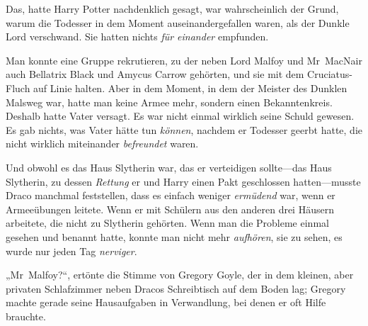 Das, hatte Harry Potter nachdenklich gesagt, war wahrscheinlich der Grund, warum die Todesser in dem Moment auseinandergefallen waren, als der Dunkle Lord verschwand. Sie hatten nichts \emph{für einander} empfunden.

Man konnte eine Gruppe rekrutieren, zu der neben Lord Malfoy und Mr~MacNair auch Bellatrix Black und Amycus Carrow gehörten, und sie mit dem Cruciatus-Fluch auf Linie halten. Aber in dem Moment, in dem der Meister des Dunklen Malsweg war, hatte man keine Armee mehr, sondern einen Bekanntenkreis. Deshalb hatte Vater versagt. Es war nicht einmal wirklich seine Schuld gewesen. Es gab nichts, was Vater hätte tun \emph{können}, nachdem er Todesser geerbt hatte, die nicht wirklich miteinander \emph{befreundet} waren.

Und obwohl es das Haus Slytherin war, das er verteidigen sollte—das Haus Slytherin, zu dessen \emph{Rettung} er und Harry einen Pakt geschlossen hatten—musste Draco manchmal feststellen, dass es einfach weniger \emph{ermüdend} war, wenn er Armeeübungen leitete. Wenn er mit Schülern aus den anderen drei Häusern arbeitete, die nicht zu Slytherin gehörten. Wenn man die Probleme einmal gesehen und benannt hatte, konnte man nicht mehr \emph{aufhören}, sie zu sehen, es wurde nur jeden Tag \emph{nerviger}.

„Mr~Malfoy?“, ertönte die Stimme von Gregory Goyle, der in dem kleinen, aber privaten Schlafzimmer neben Dracos Schreibtisch auf dem Boden lag; Gregory machte gerade seine Hausaufgaben in Verwandlung, bei denen er oft Hilfe brauchte.

